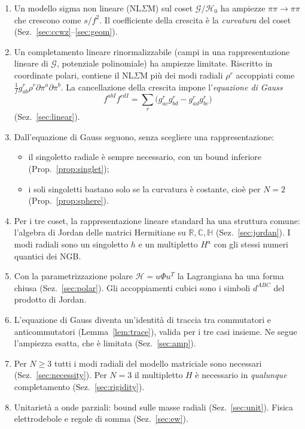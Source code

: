 \documentclass[11pt,a4paper]{article}
\numberwithin{equation}{section}
\theoremstyle{remark}
\newcommand{\Hf}{\mathcal{H}}
\newcommand{\G}{\mathcal{G}}
\newcommand{\Hg}{\mathcal{H}_0}
\newcommand{\R}{\mathbb{R}}
\newcommand{\C}{\mathbb{C}}
\newcommand{\HH}{\mathbb{H}}
\begin{document}
\begin{enumerate}[label=\textbf{\arabic*.}]
\item Un modello sigma non lineare (NL$\Sigma$M) sul coset $\G/\Hg$ ha ampiezze $\pi\pi\to\pi\pi$ che crescono come $s/f^2$. Il coefficiente della crescita è la \emph{curvatura} del coset (Sez.~\ref{sec:ccwz}--\ref{sec:geom}).
\item Un completamento lineare rinormalizzabile (campi in una rappresentazione lineare di $\G$, potenziale polinomiale) ha ampiezze limitate. Riscritto in coordinate polari, contiene il NL$\Sigma$M più dei modi radiali $\rho^r$ accoppiati come $\frac1f g^r_{ab}\rho^r\partial\pi^a\partial\pi^b$. La cancellazione della crescita impone l'\emph{equazione di Gauss}
\[
f^{abI}f^{cdI}=\sum_r\big(g^r_{ac}g^r_{bd}-g^r_{ad}g^r_{bc}\big)
\]
(Sez.~\ref{sec:linear}).
\item Dall'equazione di Gauss seguono, senza scegliere una rappresentazione:
\begin{itemize}[nosep]
\item il singoletto radiale è sempre necessario, con un bound inferiore (Prop.~\ref{prop:singlet});
\item i soli singoletti bastano solo se la curvatura è costante, cioè per $N=2$ (Prop.~\ref{prop:sphere}).
\end{itemize}
\item Per i tre coset, la rappresentazione lineare standard ha una struttura comune: l'algebra di Jordan delle matrici Hermitiane su $\R,\C,\HH$ (Sez.~\ref{sec:jordan}). I modi radiali sono un singoletto $h$ e un multipletto $H^a$ con gli stessi numeri quantici dei NGB.
\item Con la parametrizzazione polare $\Hf=u\Phi u^T$ la Lagrangiana ha una forma chiusa (Sez.~\ref{sec:polar}). Gli accoppiamenti cubici sono i simboli $d^{ABC}$ del prodotto di Jordan.
\item L'equazione di Gauss diventa un'identità di traccia tra commutatori e anticommutatori (Lemma~\ref{lem:trace}), valida per i tre casi insieme. Ne segue l'ampiezza esatta, che è limitata (Sez.~\ref{sec:amp}).
\item Per $N\ge3$ tutti i modi radiali del modello matriciale sono necessari (Sez.~\ref{sec:necessity}). Per $N=3$ il multipletto $H$ è necessario in \emph{qualunque} completamento (Sez.~\ref{sec:rigidity}).
\item Unitarietà a onde parziali: bound sulle masse radiali (Sez.~\ref{sec:unit}). Fisica elettrodebole e regole di somma (Sez.~\ref{sec:ew}).
\end{enumerate}
\end{document}
